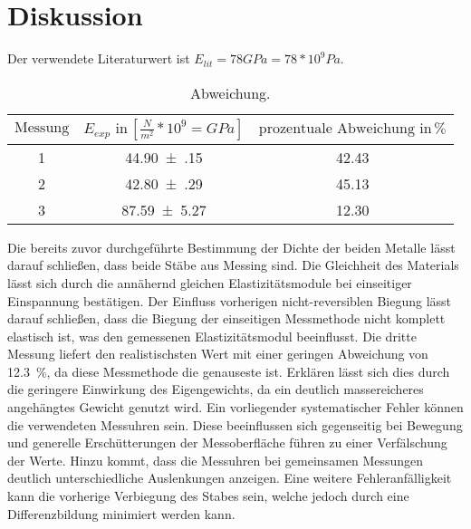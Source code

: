 \newpage
\section{Diskussion}
\label{sec:Diskussion}
Der verwendete Literaturwert ist $E_{lit} = 78 GPa = 78*10^9 Pa$\cite{litval}.
\begin{table}[h]
  \centering
  \label{tab:lit5}
  \begin{tabular}{ c c c }
    \toprule
    $\text{Messung}$
   &$E_{exp} \,\, \text{in} \, [\frac{N}{m^2}*10^9= GPa]$
   &{$\text{prozentuale Abweichung}\,\, \text{in} \, \si{\percent} $} \\

    \midrule
    1&\num{44.90(15)} & 42.43 \\
    2&\num{42.80(29)} & 45.13  \\
    3&\num{87.59(527)} & 12.30 \\

    \bottomrule
  \end{tabular}
  \caption{Abweichung.}
\end{table}


Die bereits zuvor durchgeführte Bestimmung der Dichte der beiden Metalle lässt darauf
schließen, dass beide Stäbe aus Messing sind. Die Gleichheit des Materials
lässt sich durch die annähernd gleichen Elastizitätsmodule bei einseitiger
Einspannung bestätigen. Der Einfluss vorherigen nicht-reversiblen Biegung
lässt darauf schließen, dass die Biegung der einseitigen Messmethode nicht
komplett elastisch ist, was den gemessenen Elastizitätsmodul beeinflusst.
Die dritte Messung liefert den realistischsten Wert mit einer geringen
Abweichung von \SI{12.3}{\percent}, da diese Messmethode die genauseste ist.
Erklären lässt sich dies durch die geringere Einwirkung des Eigengewichts, da
ein deutlich massereicheres angehängtes Gewicht genutzt wird.
Ein vorliegender systematischer Fehler können die verwendeten Messuhren sein.
Diese beeinflussen sich gegenseitig bei Bewegung und generelle Erschütterungen
der Messoberfläche führen zu einer Verfälschung der Werte. Hinzu kommt, dass
die Messuhren bei gemeinsamen Messungen deutlich unterschiedliche Auslenkungen
anzeigen.
Eine weitere Fehleranfälligkeit kann die vorherige Verbiegung des Stabes
sein, welche jedoch durch eine Differenzbildung minimiert werden kann.
